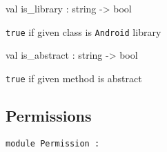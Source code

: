 \documentclass[11pt]{article}
\begin{document}
\label{val:Android.is-underscorelibrary}\begin{ocamldoccode}
val is_library : string -> bool
\end{ocamldoccode}
\begin{ocamldocdescription}
{\tt{true}} if given class is {\tt{Android}} library


\end{ocamldocdescription}




\label{val:Android.is-underscoreabstract}\begin{ocamldoccode}
val is_abstract : string -> bool
\end{ocamldoccode}
\begin{ocamldocdescription}
{\tt{true}} if given method is abstract


\end{ocamldocdescription}




\subsection{Permissions}




\begin{ocamldoccode}
{\tt{module }}{\tt{Permission}}{\tt{ : }}\end{ocamldoccode}
\label{module:Android.Permission}
\end{document}
